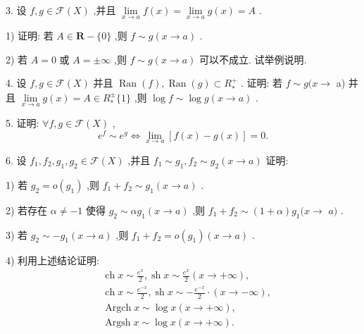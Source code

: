 3. 设 $f,g \in  \mathcal{F}\left( X\right)$ ,并且 $\mathop{\lim }\limits_{{x \rightarrow  a}}f\left( x\right)  = \mathop{\lim }\limits_{{x \rightarrow  a}}g\left( x\right)  = A$ .

1) 证明: 若 $A \in  \mathbf{R} - \{ 0\}$ ,则 $f \sim  g\left( {x \rightarrow  a}\right)$ .

2) 若 $A = 0$ 或 $A =  \pm  \infty$ ,则 $f \sim  g\left( {x \rightarrow  a}\right)$ 可以不成立. 试举例说明.

4. 设 $f,g \in  \mathcal{F}\left( X\right)$ 并且 $\operatorname{Ran}\left( f\right) ,\operatorname{Ran}\left( g\right)  \subset  {R}_{ * }^{ + }$ . 证明: 若 $f \sim  g(x \rightarrow$ a) 并且 $\mathop{\lim }\limits_{{x \rightarrow  a}}g\left( x\right)  = A \in  {R}_{ * }^{ \pm  }\{ 1\}$ ,则 $\log f \sim  \log g\left( {x \rightarrow  a}\right)$ .

5. 证明: $\forall f,g \in  \mathcal{F}\left( X\right)$ ,
$${e}^{f} \sim  {e}^{g} \Leftrightarrow  \mathop{\lim }\limits_{{x \rightarrow  a}}\left\lbrack  {f\left( x\right)  - g\left( x\right) }\right\rbrack   = 0.$$

6. 设 ${f}_{1},{f}_{2},{g}_{1},{g}_{2} \in  \mathcal{F}\left( X\right)$ ,并且 ${f}_{1} \sim  {g}_{1},{f}_{2} \sim  {g}_{2}\left( {x \rightarrow  a}\right)$ 证明:

1) 若 ${g}_{2} = o\left( {g}_{1}\right)$ ,则 ${f}_{1} + {f}_{2} \sim  {g}_{1}\left( {x \rightarrow  a}\right)$ .

2) 若存在 $\alpha  \neq   - 1$ 使得 ${g}_{2} \sim  \alpha {g}_{1}\left( {x \rightarrow  a}\right)$ ,则 ${f}_{1} + {f}_{2} \sim  \left( {1 + \alpha }\right) {g}_{1}(x \rightarrow$  $a)$ .

3) 若 ${g}_{2} \sim   - {g}_{1}\left( {x \rightarrow  a}\right)$ ,则 ${f}_{1} + {f}_{2} = o\left( {g}_{1}\right) \left( {x \rightarrow  a}\right)$ .

4) 利用上述结论证明:
\begin{align*}
	&\operatorname{ch}x \sim  \frac{{e}^{x}}{2},\operatorname{sh}x \sim  \frac{{e}^{x}}{2}\left( {x \rightarrow   + \infty }\right) ,\\
	&\operatorname{ch}x \sim  \frac{{e}^{-x}}{2},\operatorname{sh}x \sim   - \frac{{e}^{-x}}{2} \cdot  \left( {x \rightarrow   - \infty }\right) ,\\
	&\operatorname{Argch}x \sim  \log x\left( {x \rightarrow   + \infty }\right) ,\\
	&\operatorname{Argsh}x \sim  \log x\left( {x \rightarrow   + \infty }\right) .
\end{align*}

